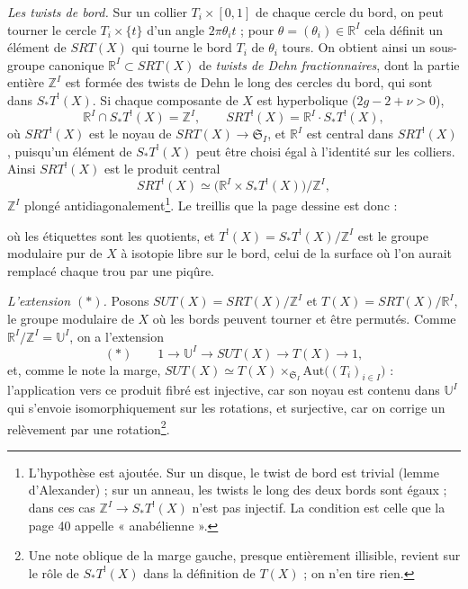 \documentclass[11pt,a4paper]{article}
\begin{document}
\emph{Les twists de bord.} Sur un collier $T_i \times [0,1]$ de chaque cercle du
bord, on peut tourner le cercle $T_i \times \{t\}$ d'un angle $2\pi\theta_i t$ ;
pour $\theta = (\theta_i) \in \mathbb{R}^{I}$ cela définit un élément de
$SRT(X)$ qui tourne le bord $T_i$ de $\theta_i$ tours. On obtient ainsi un
sous-groupe canonique $\mathbb{R}^{I} \subset SRT(X)$ de \emph{twists de
Dehn fractionnaires}, dont la partie entière $\mathbb{Z}^{I}$ est formée des
twists de Dehn le long des cercles du bord, qui sont dans $S_{*}T^{!}(X)$.
Si chaque composante de $X$ est hyperbolique ($2g - 2 + \nu > 0$),
\[
\mathbb{R}^{I} \cap S_{*}T^{!}(X) = \mathbb{Z}^{I}, \qquad
SRT^{!}(X) = \mathbb{R}^{I} \cdot S_{*}T^{!}(X),
\]
où $SRT^{!}(X)$ est le noyau de $SRT(X) \to \mathfrak{S}_I$, et
$\mathbb{R}^{I}$ est central dans $SRT^{!}(X)$, puisqu'un élément de
$S_{*}T^{!}(X)$ peut être choisi égal à l'identité sur les colliers. Ainsi
$SRT^{!}(X)$ est le produit central
\[
SRT^{!}(X) \simeq \bigl(\mathbb{R}^{I} \times S_{*}T^{!}(X)\bigr)/\mathbb{Z}^{I},
\]
$\mathbb{Z}^{I}$ plongé antidiagonalement\footnote{L'hypothèse est ajoutée. Sur
un disque, le twist de bord est trivial (lemme d'Alexander) ; sur un anneau, les
twists le long des deux bords sont égaux ; dans ces cas $\mathbb{Z}^{I} \to
S_{*}T^{!}(X)$ n'est pas injectif. La condition est celle que la page 40 appelle
« anabélienne ».}. Le treillis que la page dessine est donc :


où les étiquettes sont les quotients, et $T^{!}(X) = S_{*}T^{!}(X)/\mathbb{Z}^{I}$
est le groupe modulaire pur de $X$ à isotopie libre sur le bord, celui de la
surface où l'on aurait remplacé chaque trou par une piqûre.

\emph{L'extension $(*)$.} Posons $SUT(X) = SRT(X)/\mathbb{Z}^{I}$ et $T(X) =
SRT(X)/\mathbb{R}^{I}$, le groupe modulaire de $X$ où les bords peuvent tourner
et être permutés. Comme $\mathbb{R}^{I}/\mathbb{Z}^{I} = \mathbb{U}^{I}$, on a
l'extension
\[
(*)\qquad 1 \to \mathbb{U}^{I} \to SUT(X) \to T(X) \to 1,
\]
et, comme le note la marge, $SUT(X) \simeq T(X) \times_{\mathfrak{S}_I}
\mathrm{Aut}\bigl((T_i)_{i\in I}\bigr)$ : l'application vers ce produit fibré
est injective, car son noyau est contenu dans $\mathbb{U}^{I}$ qui s'envoie
isomorphiquement sur les rotations, et surjective, car on corrige un relèvement
par une rotation\footnote{Une note oblique de la marge gauche, presque
entièrement illisible, revient sur le rôle de $S_{*}T^{!}(X)$ dans la définition
de $T(X)$ ; on n'en tire rien.}.
\end{document}
